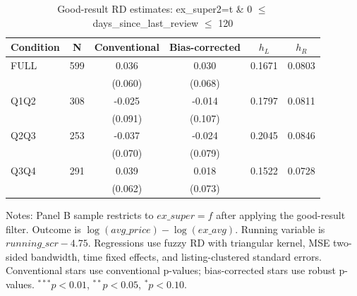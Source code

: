 \begin{table}[!htbp]
\centering
\caption{Good-result RD estimates: ex\_super2=t \& 0 $\leq$ days\_since\_last\_review $\leq$ 120}
\label{tab:good_result_days_since_last_review_120}
\begin{tabular}{lccccc}
\hline
Condition & N & Conventional & Bias-corrected & $h_L$ & $h_R$ \\
\hline
FULL & 599 & 0.036 & 0.030 & 0.1671 & 0.0803 \\
 &  & (0.060) & (0.068) &  &  \\
Q1Q2 & 308 & -0.025 & -0.014 & 0.1797 & 0.0811 \\
 &  & (0.091) & (0.107) &  &  \\
Q2Q3 & 253 & -0.037 & -0.024 & 0.2045 & 0.0846 \\
 &  & (0.070) & (0.079) &  &  \\
Q3Q4 & 291 & 0.039 & 0.018 & 0.1522 & 0.0728 \\
 &  & (0.062) & (0.073) &  &  \\
\hline
\end{tabular}
\begin{flushleft}
\footnotesize Notes: Panel B sample restricts to $ex\_super=f$ after applying the good-result filter. Outcome is $\log(avg\_price)-\log(ex\_avg)$. Running variable is $running\_scr-4.75$. Regressions use fuzzy RD with triangular kernel, MSE two-sided bandwidth, time fixed effects, and listing-clustered standard errors. Conventional stars use conventional p-values; bias-corrected stars use robust p-values. $^{***}p<0.01$, $^{**}p<0.05$, $^{*}p<0.10$.
\end{flushleft}
\end{table}


